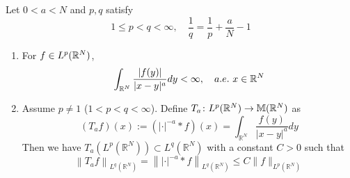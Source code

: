 \begin{thm}\label{thm:hlsineq}
	Let $0 < a < N$ and $p,q$ satisfy
	\begin{equation*}
		1 \leq p<q<\infty, \quad \frac{1}{q}=\frac{1}{p}+\frac{a}{N}-1
	\end{equation*}
	\begin{enumerate}[label=(\arabic{*})]
		\item For $f \in L^p(\mathbb{R}^N)$,
		\begin{equation*}
			\int_{\mathbb{R}^N} \frac{|f(y)|}{|x-y|^a} d y<\infty,\quad a.e.~x \in \mathbb{R}^N
		\end{equation*}

		\item Assume $p \neq 1$ ($1 < p < q <\infty$). Define $T_a \colon L^p(\mathbb{R}^N) \rightarrow \mathbb{M}(\mathbb{R}^N)$ as
		\begin{equation*}
			\left(T_a f\right)(x):=\left(|\cdot|^{-a} * f\right)(x)=\int_{\mathbb{R}^N} \frac{f(y)}{|x-y|^a} d y
		\end{equation*}
		Then we have $T_a\left(L^p\left(\mathbb{R}^N\right)\right) \subset L^q\left(\mathbb{R}^N\right)$ with a constant $C>0$ such that
		\begin{equation*}
			\left\|T_a f\right\|_{L^q\left(\mathbb{R}^N\right)}=\left\||\cdot|^{-a} * f\right\|_{L^q\left(\mathbb{R}^N\right)} \leq C\|f\|_{L^p\left(\mathbb{R}^N\right)}
		\end{equation*}
	\end{enumerate}
\end{thm}
